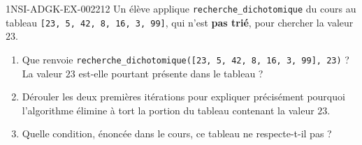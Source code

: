 \begin{exercice}{1NSI-ADGK-EX-002}{2}{12}
Un élève applique \lstinline{recherche_dichotomique} du cours au tableau
\lstinline{[23, 5, 42, 8, 16, 3, 99]}, qui n'est \textbf{pas trié}, pour chercher la valeur
$23$.
\begin{enumerate}
  \item Que renvoie \lstinline{recherche_dichotomique([23, 5, 42, 8, 16, 3, 99], 23)} ? La valeur $23$ est-elle pourtant présente dans le tableau ?
  \item Dérouler les deux premières itérations pour expliquer précisément pourquoi l'algorithme élimine à tort la portion du tableau contenant la valeur $23$.
  \item Quelle condition, énoncée dans le cours, ce tableau ne respecte-t-il pas ?
\end{enumerate}
\end{exercice}
